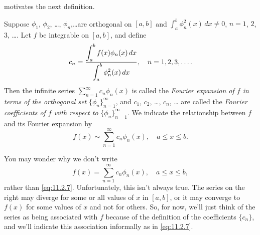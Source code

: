  motivates the next definition.

\begin{definition}\label{thmtype:11.2.2}
Suppose
$\phi_1$, $\phi_2$, \dots, $\phi_n$,\dots are
orthogonal on $[a,b]$ and
$\int_a^b\phi_n^2(x)\,dx\ne0$, $n=1$, $2$, $3$, \dots. Let
$f$ be integrable on $[a,b]$, and define
\begin{equation} \label{eq:11.2.6}
c_n=\frac{\displaystyle\int_a^bf(x)\phi_n(x)\,dx}{\displaystyle\int_a^b\phi_n^2(x)\,dx},\quad
n=1,2,3,\dots.
\end{equation}
Then the infinite series
$\sum_{n=1}^\infty c_n\phi_n(x)$ is called the
\emph{\color{blue}Fourier expansion of $f$ in terms of the orthogonal set}
$\{\phi_n\}_{n=1}^\infty$, and
$c_1$, $c_2$, \dots, $c_n$, \dots
are called the \emph{\color{blue}Fourier coefficients of $f$ with respect to}
$\{\phi_n\}_{n=1}^\infty$. We indicate the relationship between $f$
and its Fourier
 expansion by
\begin{equation} \label{eq:11.2.7}
f(x)\sim\sum_{n=1}^\infty c_n\phi_n(x),\quad  a\le x\le b.
\end{equation}
\end{definition}

You may wonder why we don't write
\[
f(x)=\sum_{n=1}^\infty c_n\phi_n(x),\quad  a\le x\le b,
\]
rather than \eqref{eq:11.2.7}.
Unfortunately, this isn't always true. The series on the right
may diverge for some or all values
of $x$ in $[a,b]$, or it may converge to $f(x)$ for some values of
$x$ and not for others.  So, for now,  we'll just think of the series
as being associated with $f$ because of the definition
of the coefficients $\{c_n\}$, and we'll indicate
this association informally as in \eqref{eq:11.2.7}.



